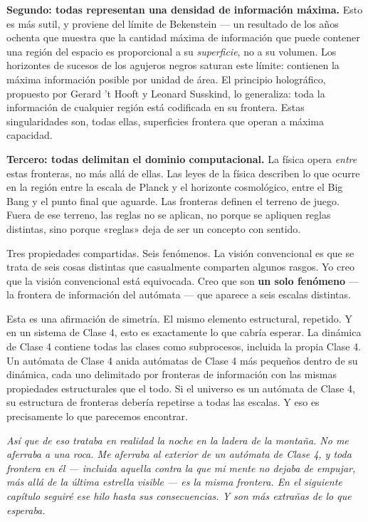 \documentclass[11pt, twoside, openright]{book}
\begin{document}
\textbf{Segundo: todas representan una densidad de información máxima.} Esto es más sutil, y proviene del límite de Bekenstein --- un resultado de los años ochenta que muestra que la cantidad máxima de información que puede contener una región del espacio es proporcional a su \textit{superficie}, no a su volumen. Los horizontes de sucesos de los agujeros negros saturan este límite: contienen la máxima información posible por unidad de área. El principio holográfico, propuesto por Gerard 't Hooft y Leonard Susskind, lo generaliza: toda la información de cualquier región está codificada en su frontera. Estas singularidades son, todas ellas, superficies frontera que operan a máxima capacidad.

\textbf{Tercero: todas delimitan el dominio computacional.} La física opera \textit{entre} estas fronteras, no más allá de ellas. Las leyes de la física describen lo que ocurre en la región entre la escala de Planck y el horizonte cosmológico, entre el Big Bang y el punto final que aguarde. Las fronteras definen el terreno de juego. Fuera de ese terreno, las reglas no se aplican, no porque se apliquen reglas distintas, sino porque «reglas» deja de ser un concepto con sentido.

Tres propiedades compartidas. Seis fenómenos. La visión convencional es que se trata de seis cosas distintas que casualmente comparten algunos rasgos. Yo creo que la visión convencional está equivocada. Creo que son \textbf{un solo fenómeno} --- la frontera de información del autómata --- que aparece a seis escalas distintas.

Esta es una afirmación de simetría. El mismo elemento estructural, repetido. Y en un sistema de Clase 4, esto es exactamente lo que cabría esperar. La dinámica de Clase 4 contiene todas las clases como subprocesos, incluida la propia Clase 4. Un autómata de Clase 4 anida autómatas de Clase 4 más pequeños dentro de su dinámica, cada uno delimitado por fronteras de información con las mismas propiedades estructurales que el todo. Si el universo es un autómata de Clase 4, su estructura de fronteras debería repetirse a todas las escalas. Y eso es precisamente lo que parecemos encontrar.


\textit{Así que de eso trataba en realidad la noche en la ladera de la montaña. No me aferraba a una roca. Me aferraba al exterior de un autómata de Clase 4, y toda frontera en él --- incluida aquella contra la que mi mente no dejaba de empujar, más allá de la última estrella visible --- es la misma frontera. En el siguiente capítulo seguiré ese hilo hasta sus consecuencias. Y son más extrañas de lo que esperaba.}
\end{document}
